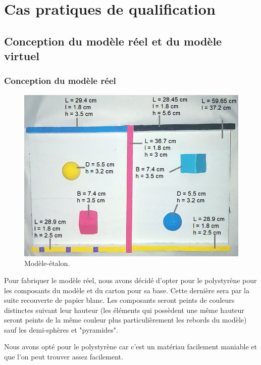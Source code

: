 \documentclass[a4paper, 12pt]{book}
\begin{document}
\chapter{Cas pratiques de qualification}

\section{Conception du modèle réel et du modèle virtuel}
\subsection{Conception du modèle réel}
\begin{center}
	\begin{figure}[htbp]
  		\hspace{0.75cm}
 		\includegraphics[scale=0.5]{images/realModel.png} \hspace{2cm}
  		\caption{Modèle-étalon.\label{fig-model}}
	\end{figure}
\end{center}

Pour fabriquer le modèle réel, nous avons décidé d'opter pour le polystyrène pour les composants du modèle et du carton pour sa base. Cette dernière sera par la suite recouverte de papier blanc. Les composants seront peints de couleurs distinctes suivant leur hauteur (les éléments qui possèdent une même hauteur seront peints de la même couleur plus particulièrement les rebords du modèle) sauf les demi-sphères et "pyramides".
\par Nous avons opté pour le polystyrène car c'est un matériau facilement maniable et que l'on peut trouver assez facilement.
\end{document}
